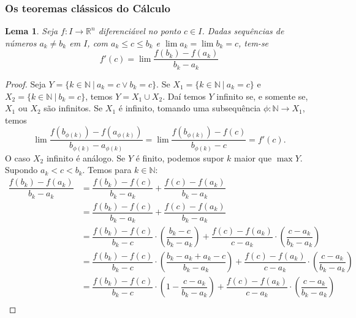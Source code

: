 \documentclass{article}
\theoremstyle{theorem}
\theoremstyle{lemma}
\newtheorem{lema}{Lema}
\theoremstyle{definition}
\theoremstyle{remark}
\begin{document}
   \subsubsection{ Os teoremas clássicos do Cálculo}
   \begin{lema}
	   Seja \(f:I\to \mathbb{R}^n\) diferenciável no ponto \(c\in I\). Dadas sequências de números \(a_k \neq b_k\) em \(I\), com \(a_k \leq c \leq b_k\) e \(\lim a_k = \lim b_k = c\), tem-se \[ f'(c) = \lim \dfrac{f(b_k) - f(a_k)}{b_k - a_k} \]
   \end{lema}
   \begin{proof}
	   Seja \(Y = \{k\in \mathbb{N} \: | \: a_k = c \lor b_k  = c \}\). Se \( X_1 = \{k\in \mathbb{N} \: | \: a_k = c  \}\) e \( X_2 = \{k\in \mathbb{N} \: | \: b_k = c  \}\), temos \( Y = X_1\cup X_2 \). Daí temos \(Y\) infinito se, e somente se, \(X_1\) ou \(X_2\) são infinitos. Se \(X_1\) é infinito, tomando uma subsequência \(\phi : \mathbb{N} \to X_1\), temos  \[ \lim \dfrac{f(b_{\phi(k)}) - f(a_{\phi(k)})}{b_{\phi(k)} - a_{\phi(k)}} = \lim \dfrac{f(b_{\phi(k)}) - f(c)}{b_{\phi(k)} - c}  = f'(c) .\]
	   O caso \(X_2\) infinito é análogo.  Se \(Y\) é finito, podemos supor \(k\) maior que \(\max Y\). Supondo \(a_k < c < b_k\).  Temos  para \(k\in \mathbb{N}\):
	   \begin{align*}
		   \dfrac{f(b_k) - f(a_k)}{b_k - a_k} &=  \dfrac{f(b_k) - f(c) }{b_k -a_k} + \dfrac{ f(c) - f(a_k)}{b_k - a_k }\\
		   &=  \dfrac{f(b_k) - f(c) }{b_k -a_k} + \dfrac{ f(c) - f(a_k)}{b_k - a_k }\\
		   &=  \dfrac{f(b_k) - f(c) }{b_k -c} \cdot \left( \dfrac{b_k - c}{b_k - a_k}\right)  + \dfrac{ f(c) - f(a_k)}{c - a_k } \cdot \left( \dfrac{c - a_k}{b_k - a_k}\right) \\
		   &=  \dfrac{f(b_k) - f(c) }{b_k -c} \cdot \left( \dfrac{b_k - a_k + a_k - c}{b_k - a_k}\right)  + \dfrac{ f(c) - f(a_k)}{c - a_k } \cdot \left( \dfrac{c - a_k}{b_k - a_k}\right) \\
		   &=  \dfrac{f(b_k) - f(c) }{b_k -c} \cdot \left( 1 - \dfrac{ c- a_k}{b_k - a_k}\right)  + \dfrac{ f(c) - f(a_k)}{c - a_k } \cdot \left( \dfrac{c - a_k}{b_k - a_k}\right) \\
	   \end{align*}


\end{proof}
\end{document}

